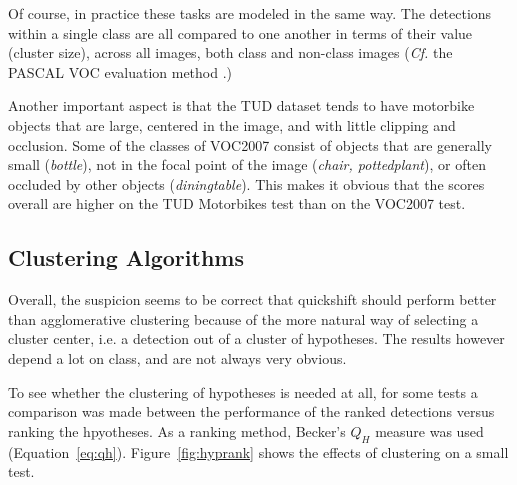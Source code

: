 Of course, in practice these tasks are modeled in the same way. The detections within a single class are all compared to one another in terms of their value (cluster size), across all images, both class and non-class images (\emph{Cf.} the PASCAL VOC evaluation method \cite{pascal-voc-2007}.)

Another important aspect is that the TUD dataset tends to have motorbike objects that are large, centered in the image, and with little clipping and occlusion. Some of the classes of VOC2007 consist of objects that are generally small (\emph{bottle}), not in the focal point of the image (\emph{chair, pottedplant}), or often occluded by other objects (\emph{diningtable}). This makes it obvious that the scores overall are higher on the TUD Motorbikes test than on the VOC2007 test.



\subsection{Clustering Algorithms} %
\label{sub:anal_clustering_algorithms}

Overall, the suspicion seems to be correct that quickshift should perform better than agglomerative clustering because of the more natural way of selecting a cluster center, i.e. a detection out of a cluster of hypotheses. The results however depend a lot on class, and are not always very obvious.

To see whether the clustering of hypotheses is needed at all, for some tests a comparison was made between the performance of the ranked detections versus ranking the hpyotheses. As a ranking method, Becker's $Q_H$ measure was used (Equation~\ref{eq:qh}). Figure~\ref{fig:hyprank} shows the effects of clustering on a small test.

